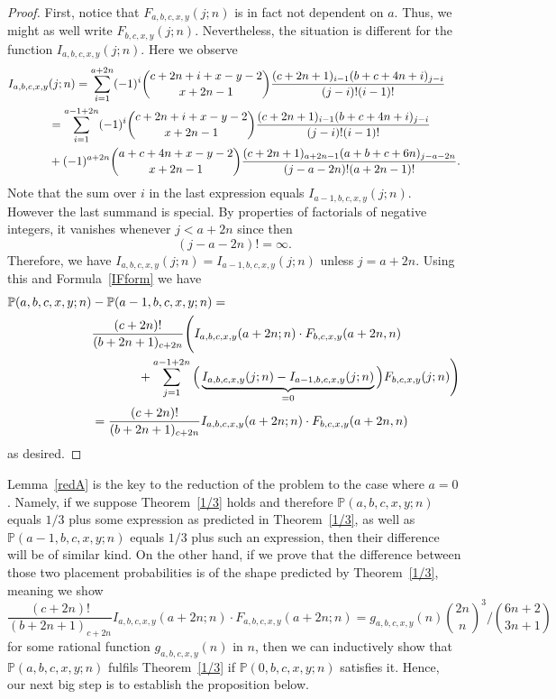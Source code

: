 \documentclass{amsart}
\numberwithin{equation}{section}
\begin{document}
\begin{proof}
    First, notice that $F_{a,b,c,x,y}(j;n)$ is in fact not dependent on $a$. Thus, we might as well write $F_{b,c,x,y}(j;n)$. Nevertheless, the situation is different for the function $I_{a,b,c,x,y}(j;n)$. Here we observe
    \begin{align}
        I_{a,b,c,x,y}&(j;n)=\sum_{i=1}^{a+2n}(-1)^{i}\binom{c+2n+i+x-y-2}{x+2n-1}\frac{(c+2n+1)_{i-1}(b+c+4n+i)_{j-i}}{(j-i)!(i-1)!}\notag \\
        &=\sum_{i=1}^{a-1+2n}(-1)^{i}\binom{c+2n+i+x-y-2}{x+2n-1}\frac{(c+2n+1)_{i-1}(b+c+4n+i)_{j-i}}{(j-i)!(i-1)!}\notag\\
        &+(-1)^{a+2n}\binom{a+c+4n+x-y-2}{x+2n-1}\frac{(c+2n+1)_{a+2n-1}(a+b+c+6n)_{j-a-2n}}{(j-a-2n)!(a+2n-1)!}.\notag
    \end{align}
    Note that the sum over $i$ in the last expression equals $I_{a-1,b,c,x,y}(j;n)$. However the last summand is special. By properties of factorials of negative integers, it vanishes whenever $j<a+2n$ since then
    \[(j-a-2n)!=\infty.\]
    Therefore, we have $I_{a,b,c,x,y}(j;n)=I_{a-1,b,c,x,y}(j;n)$ unless $j=a+2n$. Using this and Formula~\eqref{IFform} we have
    \begin{align}
        \mathbb{P}(a,b,c,x,y;n)&-\mathbb{P}(a-1,b,c,x,y;n)=\notag\\
        &\frac{(c+2n)!}{(b+2n+1)_{c+2n}}\Bigg(I_{a,b,c,x,y}(a+2n;n)\cdot F_{b,c,x,y}(a+2n,n) \hphantom{a}\notag \\
        &\hphantom{aaaaaaa}+\sum_{j=1}^{a-1+2n}\Big(\underbrace{I_{a,b,c,x,y}(j;n)-I_{a-1,b,c,x,y}(j;n)}_{=0}\Big)F_{b,c,x,y}(j;n)\Bigg)\notag\\
        &=\frac{(c+2n)!}{(b+2n+1)_{c+2n}}I_{a,b,c,x,y}(a+2n;n)\cdot F_{b,c,x,y}(a+2n,n) \notag
    \end{align}
    as desired.
\end{proof}

Lemma~\ref{redA} is the key to the reduction of the problem to the case where $a=0$. Namely, if we suppose Theorem~\ref{1/3} holds and therefore $\mathbb{P}(a,b,c,x,y;n)$ equals $1/3$ plus some expression as predicted in Theorem~\ref{1/3}, as well as $\mathbb{P}(a-1,b,c,x,y;n)$ equals $1/3$ plus such an expression, then their difference will be of similar kind. On the other hand, if we prove that the difference between those two placement probabilities is of the shape predicted by Theorem~\ref{1/3}, meaning we show
\[\frac{(c+2n)!}{(b+2n+1)_{c+2n}}I_{a,b,c,x,y}(a+2n;n)\cdot F_{a,b,c,x,y}(a+2n;n)=g_{a,b,c,x,y}(n)\binom{2n}{n}^3\bigg/\binom{6n+2}{3n+1}\]
for some rational function $g_{a,b,c,x,y}(n)$ in $n$, then we can inductively show that $\mathbb{P}(a,b,c,x,y;n)$ fulfils Theorem~\ref{1/3} if $\mathbb{P}(0,b,c,x,y;n)$ satisfies it. Hence, our next big step is to establish the proposition below.
\end{document}
